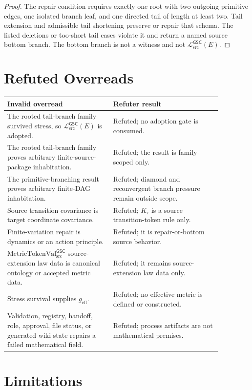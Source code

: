 \documentclass[11pt]{article}
\newcommand{\MetricTokenVal}{\mathrm{MetricTokenVal}_{\mathrm{src}}^{\mathsf{GSC}}}
\newcommand{\MetricData}{\mathcal{L}_{\mathrm{src}}^{\mathsf{GSC}}}
\newcommand{\geff}{g_{\mathrm{eff}}}
\begin{document}
\begin{proof}
The repair condition requires exactly one root with two outgoing primitive
edges, one isolated branch leaf, and one directed tail of length at least
two. Tail extension and admissible tail shortening preserve or repair that
schema. The listed deletions or too-short tail cases violate it and return a
named source bottom branch. The bottom branch is not a witness and not
\(\MetricData(E)\).
\end{proof}

\section{Refuted Overreads}

\begin{center}
\begin{tabular}{p{0.43\linewidth}p{0.44\linewidth}}
\toprule
Invalid overread & Refuter result \\
\midrule
The rooted tail-branch family survived stress, so \(\MetricData(E)\) is
adopted. & Refuted; no adoption gate is consumed. \\
The rooted tail-branch family proves arbitrary finite-source-package
inhabitation. & Refuted; the result is family-scoped only. \\
The primitive-branching result proves arbitrary finite-DAG inhabitation. &
Refuted; diamond and reconvergent branch pressure remain outside scope. \\
Source transition covariance is target coordinate covariance. &
Refuted; \(K_{\tau}\) is a source transition-token rule only. \\
Finite-variation repair is dynamics or an action principle. &
Refuted; it is repair-or-bottom source behavior. \\
\(\MetricTokenVal\) source-extension law data is canonical ontology or
accepted metric data. & Refuted; it remains source-extension law data only. \\
Stress survival supplies \(\geff\). &
Refuted; no effective metric is defined or constructed. \\
Validation, registry, handoff, role, approval, file status, or generated
wiki state repairs a failed mathematical field. &
Refuted; process artifacts are not mathematical premises. \\
\bottomrule
\end{tabular}
\end{center}

\section{Limitations}
\end{document}
